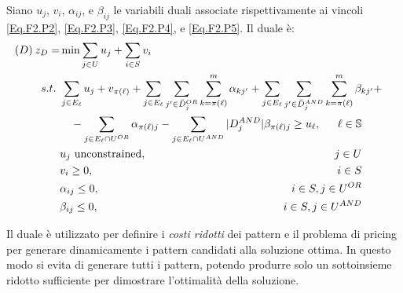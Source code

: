 \documentclass[12pt,a4paper,openright,twoside]{book}
\begin{document}
Siano $u_j$, $v_i$, $\alpha_{ij}$, e $\beta_{ij}$ le variabili duali associate rispettivamente ai vincoli \eqref{Eq.F2.P2}, \eqref{Eq.F2.P3}, \eqref{Eq.F2.P4}, e \eqref{Eq.F2.P5}. Il duale è:
\begin{alignat}{3}
(D) \: z_D  = & \min \sum_{j \in U} u_j + \sum_{i \in S} v_i                                         &\hspace{-8.0cm} \label{Eq.F2.D1}\\
  s.t.\ & \sum_{j \in E_{\ell}} u_j + v_{\pi(\ell)}
          + \sum_{j \in E_{\ell}} \sum_{j' \in \bar{D}^{OR}_j} \sum_{k=\pi(\ell)}^{m} \alpha_{kj'}
          + \sum_{j \in E_{\ell}} \sum_{j' \in \bar{D}^{AND}_j} \sum_{k=\pi(\ell)}^{m} \beta_{kj'} + &     \notag \\
        & \quad - \sum_{j \in E_{\ell} \cap U^{OR}} \alpha_{\pi(\ell)j}
                - \sum_{j \in E_{\ell} \cap U^{AND}} |D^{AND}_j|\beta_{\pi(\ell)j}\geq u_{\ell},
                                                               &\hspace{-8.0cm} \ell \in \mathbb{S}    \hspace{1.0cm} \label{Eq.F2.D2} \\
        & u_j \textrm{ unconstrained},                         &\hspace{-8.0cm} j \in U                \hspace{1.0cm} \label{Eq.F2.D3} \\
        & v_i \geq 0,                                          &\hspace{-8.0cm} i \in S                \hspace{1.0cm} \label{Eq.F2.D4} \\
        & \alpha_{ij} \leq 0,                                  &\hspace{-8.0cm} i \in S, j \in U^{OR}  \hspace{1.0cm} \label{Eq.F2.D5} \\
        & \beta_{ij} \leq 0,                                   &\hspace{-8.0cm} i \in S, j \in U^{AND} \hspace{1.0cm} \label{Eq.F2.D6}
\end{alignat}

Il duale è utilizzato per definire i \emph{costi ridotti} dei pattern e il problema di pricing per generare dinamicamente i pattern candidati alla soluzione ottima. In questo modo si evita di generare tutti i pattern, potendo produrre solo un sottoinsieme ridotto sufficiente per dimostrare l'ottimalità della soluzione.
\end{document}
